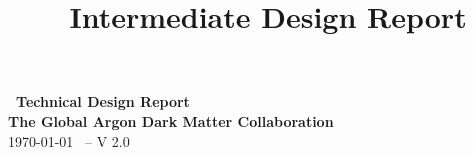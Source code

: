 \documentclass[aps,superscriptaddress,floatfix,nofootinbib,showpacs,amsmath,amssymb,altaffilletter,floatfix,11pt]{revtex4-1}
\begin{document}
\setlength{\parindent}{1em}
\setdefaultleftmargin{1em}{1em}{}{}{}{}
\setcounter{page}{0}\thispagestyle{empty}
\onecolumngrid
\begin{center}
{\bf \LARGE \DSk\ Technical Design Report}\\
\vspace{.5in}
{\bf \Large The Global Argon Dark Matter Collaboration}\\
\vspace{.5in}
\today
{\large\ -- V 2.0}
\end{center}
\vspace{.2in}

\clearpage
\newpage
{}
\title{\DSk\ Intermediate Design Report}

\maketitle
\clearpage
\onecolumngrid
\setcounter{tocdepth}{2}
\tableofcontents
\makeatletter
\let\toc@pre\relax
\let\toc@post\relax
\makeatother
\clearpage
\listoffigures
\clearpage
\listoftables
\clearpage
\newpage
{}
\clearpage
\onecolumngrid
\newpage
{}
\clearpage



  

  
  
  



 











\end{document}
